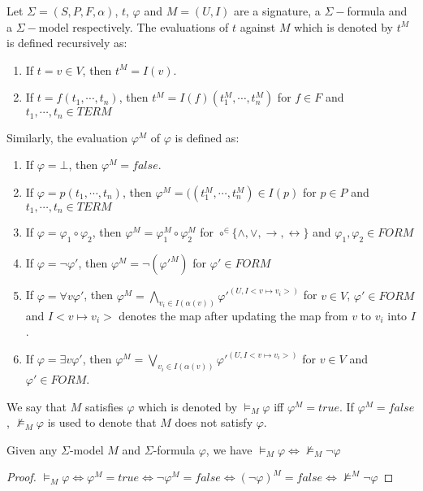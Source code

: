 \begin{definition}
Let $\Sigma = (S, P, F, \alpha)$, $t$, $\varphi$ and $M=(U, I)$ are a signature, a $\Sigma-$formula and a $\Sigma-$model respectively. The evaluations of $t$ against $M$ which is denoted by $t^M$ is defined recursively as:
\begin{enumerate}
\item If $t = v \in V$, then $t^M = I(v)$.
\item If $t = f(t_1, \cdots, t_n)$, then $t^M = I(f)(t_1^M, \cdots, t_n^M)$ for $f \in F$ and $t_1,\cdots, t_n \in TERM$
\end{enumerate}
Similarly, the evaluation $\varphi^M$ of $\varphi$ is defined as:
\begin{enumerate}
\item If $\varphi = \bot$, then $\varphi^M = false$.
\item If $\varphi = p(t_1,\cdots,t_n)$, then $\varphi^M = ((t_1^M,\cdots,t_n^M) \in I(p)$ for $p \in P$ and $t_1,\cdots, t_n \in TERM$
\item If $\varphi = \varphi_1 \circ \varphi_2$, then $\varphi^M = \varphi_1^M \circ \varphi_2^M$ for $\circ ^\in \{\wedge, \vee, \rightarrow, \leftrightarrow\}$ and $\varphi_1, \varphi_2 \in FORM$
\item If $\varphi = \neg\varphi'$, then $\varphi^M = \neg(\varphi'^M)$ for $\varphi' \in FORM$
\item If $\varphi = \forall v \varphi'$, then $\varphi^M = \bigwedge\limits_{v_i \in I(\alpha(v))}\varphi'^{(U, I<v \mapsto v_i>)}$ for $v \in V$,  $\varphi' \in FORM$ and $I<v \mapsto v_i>$ denotes the map after updating the map from $v$ to $v_i$ into $I$.
\item If $\varphi = \exists v \varphi'$, then $\varphi^M = \bigvee\limits_{v_i \in I(\alpha(v))}\varphi'^{(U, I<v \mapsto v_i>)}$ for $v \in V$ and  $\varphi' \in FORM$.
\end{enumerate}
We say that $M$ satisfies $\varphi$ which is denoted by $\models_M \varphi$ iff $\varphi^M = true$. If $\varphi^M = false$, $\not\models_M \varphi$ is used to denote that $M$ does not satisfy $\varphi$.
\end{definition}

\begin{lemma}\label{lemma:model-sat-unsat}
Given any $\Sigma$-model $M$ and $\Sigma$-formula $\varphi$, we have $\models_M \varphi \iff \not\models_M \neg \varphi$
\end{lemma}

\begin{proof}
$\models_M \varphi \iff \varphi^M = true \iff \neg \varphi^M = false \iff (\neg \varphi)^M = false \iff \not\models^M \neg \varphi$
\end{proof}

